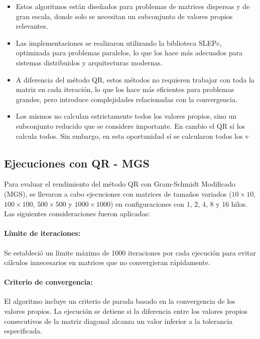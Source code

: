 \documentclass{article}
\begin{document}
\begin{itemize}
    \item Estos algoritmos están diseñados para problemas de matrices dispersas y de gran escala, donde solo se necesitan un subconjunto de valores propios relevantes.
    \item Las implementaciones se realizaron utilizando la biblioteca SLEPc, optimizada para problemas paralelos, lo que los hace más adecuados para sistemas distribuidos y arquitecturas modernas.
    \item A diferencia del método QR, estos métodos no requieren trabajar con toda la matriz en cada iteración, lo que los hace más eficientes para problemas grandes, pero introduce complejidades relacionadas con la convergencia.
    \item Los mismos no calculan estrictamente todos los valores propios, sino un subconjunto reducido que se considere importante. En cambio el QR sí los calcula todos. Sin embargo, en esta oportunidad sí se calcularon todos los v
\end{itemize}

\subsection{Ejecuciones con QR - MGS}

Para evaluar el rendimiento del método QR con Gram-Schmidt Modificado (MGS), se llevaron a cabo ejecuciones con matrices de tamaños variados (\(10 \times 10\), \(100 \times 100\), \(500 \times 500\) y \(1000 \times 1000\)) en configuraciones con \(1\), \(2\), \(4\), \(8\) y \(16\) hilos. Las siguientes consideraciones fueron aplicadas:

\paragraph{Límite de iteraciones:} Se estableció un límite máximo de 1000 iteraciones por cada ejecución para evitar cálculos innecesarios en matrices que no convergieran rápidamente.

\paragraph{Criterio de convergencia:} El algoritmo incluye un criterio de parada basado en la convergencia de los valores propios. La ejecución se detiene si la diferencia entre los valores propios consecutivos de la matriz diagonal alcanza un valor inferior a la tolerancia especificada.
\end{document}
